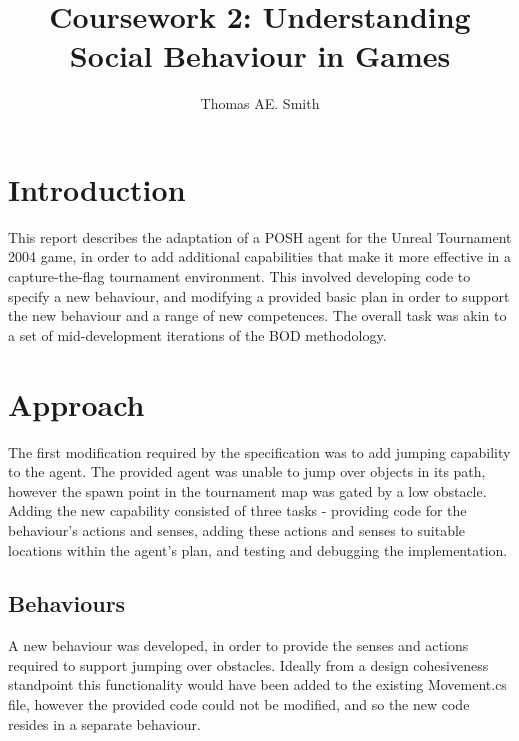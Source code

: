 \documentclass[a4paper,12pt]{article}
\title{Coursework 2: Understanding Social Behaviour in Games}
\author{Thomas AE. Smith}
\begin{document}
\maketitle

\section{Introduction}
This report describes the adaptation of a POSH agent for the Unreal Tournament 2004 game, in order to add additional capabilities that make it more effective in a capture-the-flag tournament environment. This involved developing code to specify a new behaviour, and modifying a provided basic plan in order to support the new behaviour and a range of new competences. The overall task was akin to a set of mid-development iterations of the BOD methodology.%


\section{Approach}
The first modification required by the specification was to add jumping capability to the agent. The provided agent was unable to jump over objects in its path, however the spawn point in the tournament map was gated by a low obstacle. Adding the new capability consisted of three tasks - providing code for the behaviour's actions and senses, adding these actions and senses to suitable locations within the agent's plan, and testing and debugging the implementation.

\subsection{Behaviours}
A new behaviour was developed, in order to provide the senses and actions required to support jumping over obstacles. Ideally from a design cohesiveness standpoint this functionality would have been added to the existing Movement.cs file, however the provided code could not be modified, and so the new code resides in a separate behaviour.
\end{document}
